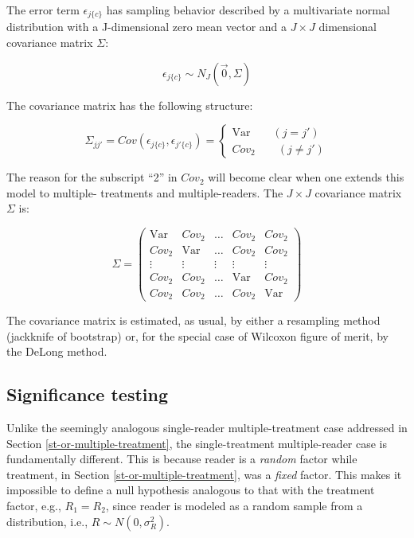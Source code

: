 \documentclass[
]{book}
\begin{document}
The error term \(\epsilon_{j\{c\}}\) has sampling behavior described by a multivariate normal distribution with a J-dimensional zero mean vector and a \(J \times J\) dimensional covariance matrix \(\Sigma\):

\begin{equation}
\epsilon_{j\{c\}} \sim N_J\left ( \vec{0} ,  \Sigma\right )
\label{eq:def-epsilon-multiple-readers}
\end{equation}

The covariance matrix has the following structure:

\begin{equation}
\Sigma_{jj'}=Cov\left ( \epsilon_{j\{c\}}, \epsilon_{j'\{c\}} \right )=\left\{\begin{matrix}
\text{Var} \qquad (j=j')\\ 
Cov_2 \qquad (j\neq j')
\end{matrix}\right.
\label{eq:def-sigma-multiple-reader}
\end{equation}

The reason for the subscript ``2'' in \(Cov_2\) will become clear when one extends this model to multiple- treatments and multiple-readers. The \(J \times J\) covariance matrix \(\Sigma\) is:

\begin{equation}
\Sigma=
\begin{pmatrix}
\text{Var} & Cov_2   & \ldots & Cov_2 & Cov_2 \\
Cov_2 & \text{Var}   & \ldots &Cov_2 & Cov_2 \\
\vdots & \vdots & \vdots & \vdots & \vdots \\
Cov_2 & Cov_2 & \ldots & \text{Var} & Cov_2 \\
Cov_2 & Cov_2 & \ldots & Cov_2 & \text{Var}
\end{pmatrix}
\label{eq:ExampleSigma1}
\end{equation}

The covariance matrix is estimated, as usual, by either a resampling method (jackknife of bootstrap) or, for the special case of Wilcoxon figure of merit, by the DeLong method.

\hypertarget{st-or-multiple-reader}{%
\subsection{Significance testing}\label{st-or-multiple-reader}}

Unlike the seemingly analogous single-reader multiple-treatment case addressed in Section \ref{st-or-multiple-treatment}, the single-treatment multiple-reader case is fundamentally different. This is because reader is a \emph{random} factor while treatment, in Section \ref{st-or-multiple-treatment}, was a \emph{fixed} factor. This makes it impossible to define a null hypothesis analogous to that with the treatment factor, e.g., \(R_1 = R_2\), since reader is modeled as a random sample from a distribution, i.e., \(R \sim N(0,\sigma_R^2)\).
\end{document}
